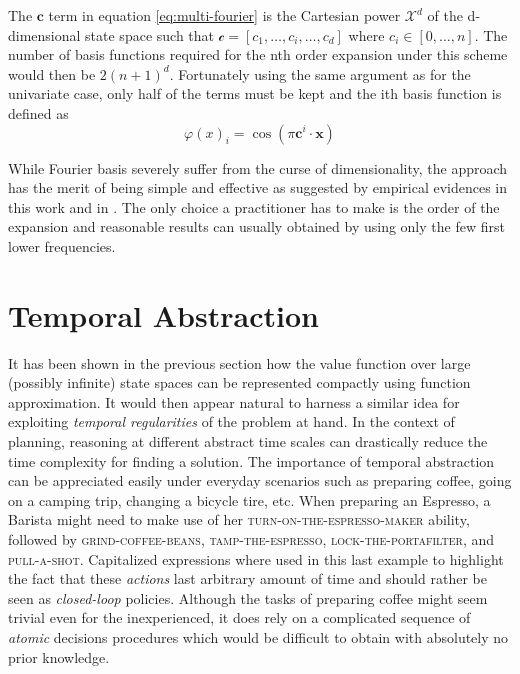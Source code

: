 \documentclass[12pt, oneside, extrafontsizes]{memoir}  %
\theoremstyle{plain}
\theoremstyle{definition}
\begin{document}
The $\mathbf{c}$ term in equation \ref{eq:multi-fourier} is the Cartesian power 
$\mathcal{X}^d$ of the d-dimensional state space such that $\mathcal{c} = [c_1,
\dots, c_i, \dots, c_d]$ where $c_i \in [0, \dots, n]$. The number of basis functions
required for the nth order expansion under this scheme would then be $2(n+1)^d$.
Fortunately using the same argument as for the univariate case, only half of the terms
must be kept and the ith basis function is defined as
\begin{equation}
\varphi(x)_i = \cos \left(  \pi \mathbf{c}^i \cdot \mathbf{x} \right)
\end{equation}

While Fourier basis severely suffer from the curse of dimensionality, the approach has
the merit of being simple and effective as suggested by empirical evidences in this
work and in \cite{Konidaris2011b} . The only choice a practitioner has to make is the
order of the expansion and reasonable results can usually obtained by using only the
few first lower frequencies.

\chapter{Temporal Abstraction}

It has been shown in the previous section how the value function over large 
(possibly infinite)
state spaces can be represented compactly using function approximation. It would
then appear natural to harness a similar idea for exploiting \textit{temporal
regularities} of the problem at hand. In the context of planning, reasoning at different
abstract time scales can drastically reduce the time complexity for finding a solution. 
The importance of temporal abstraction can be appreciated easily under everyday
scenarios such as preparing coffee, going on a camping trip, changing a bicycle tire,
etc. When preparing an Espresso, a Barista might need to make use of her
\textsc{turn-on-the-espresso-maker} ability, followed by \textsc{grind-coffee-beans},
\textsc{tamp-the-espresso}, \textsc{lock-the-portafilter}, and \textsc{pull-a-shot}.
Capitalized expressions where used in this last example to highlight the fact that these
\textit{actions} last arbitrary amount of time and should rather be seen as
\textit{closed-loop} policies. Although the tasks of preparing coffee might seem trivial
even for the inexperienced, it does rely on a complicated sequence of \textit{atomic}
decisions procedures which would be difficult to obtain with absolutely no prior
knowledge. 
\end{document}
